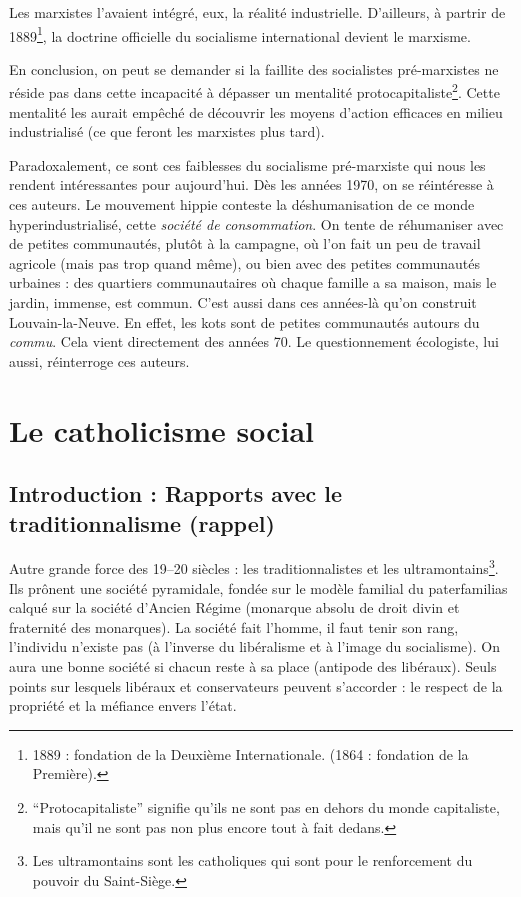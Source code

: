 \documentclass[12pt]{report}
\begin{document}
Les marxistes l'avaient intégré, eux, la réalité industrielle. D'ailleurs, à partrir de 1889\footnote{1889 : fondation de la Deuxième Internationale. (1864 : fondation de la Première).}, la doctrine officielle du socialisme international devient le marxisme.

En conclusion, on peut se demander si la faillite des socialistes pré-marxistes ne réside pas dans cette incapacité à dépasser un mentalité protocapitaliste\footnote{\enquote{Protocapitaliste} signifie qu'ils ne sont pas en dehors du monde capitaliste, mais qu'il ne sont pas non plus encore tout à fait dedans.}. Cette mentalité les aurait empêché de découvrir les moyens d'action efficaces en milieu industrialisé (ce que feront les marxistes plus tard).

Paradoxalement, ce sont ces faiblesses du socialisme pré-marxiste qui nous les rendent intéressantes pour aujourd'hui.
Dès les années 1970, on se réintéresse à ces auteurs. Le mouvement hippie conteste la déshumanisation de ce monde hyperindustrialisé, cette \emph{société de consommation}. On tente de réhumaniser avec de petites communautés, plutôt à la campagne, où l'on fait un peu de travail agricole (mais pas trop quand même), ou bien avec des petites communautés urbaines : des quartiers communautaires où chaque famille a sa maison, mais le jardin, immense, est commun.
C'est aussi dans ces années-là qu'on construit Louvain-la-Neuve. En effet, les kots sont de petites communautés autours du \emph{commu}. Cela vient directement des années 70.
Le questionnement écologiste, lui aussi, réinterroge ces auteurs.

\section{Le catholicisme social}

\subsection*{Introduction : Rapports avec le traditionnalisme (rappel)}

Autre grande force des 19--20 siècles : les traditionnalistes et les ultramontains\footnote{Les ultramontains sont les catholiques qui sont pour le renforcement du pouvoir du Saint-Siège.}. Ils prônent une société pyramidale, fondée sur le modèle familial du paterfamilias calqué sur la
société d'Ancien Régime (monarque absolu de droit divin et fraternité des monarques). La société fait l’homme, il
faut tenir son rang, l’individu n’existe pas (à l’inverse du libéralisme et à l’image du
socialisme). On aura une bonne société si chacun reste à sa place (antipode des libéraux). Seuls
points sur lesquels libéraux et conservateurs peuvent s’accorder : le respect de la propriété et la
méfiance envers l'état.
\end{document}
